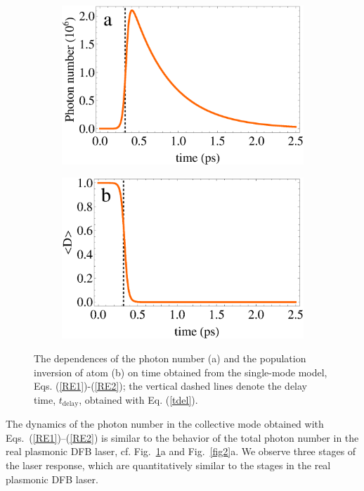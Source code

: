 \documentclass[aps,prapplied,amsmath,amssymb,onecolumn,superscriptaddress,showpacs,floatfix,longbibliography]{revtex4-1}
\begin{document}
\begin{figure}[h]
	\centering
	\begin{subfigure}[h]{0.45\linewidth}
		\includegraphics[width=\linewidth]{Fig4a.eps}
	\end{subfigure}
	\begin{subfigure}[h!]{0.45\linewidth}
		\includegraphics[width=\linewidth]{Fig4b.eps}
	\end{subfigure}
	\caption{The dependences of the photon number (a) and the population inversion of atom (b) on time obtained from the single-mode model, Eqs. (\ref{RE1})-(\ref{RE2}); the vertical dashed lines denote the delay time, $t_{\text{delay}}$, obtained with Eq. (\ref{tdel}).
	}
	\label{fig4}
\end{figure}

The dynamics of the photon number in the collective mode obtained with Eqs.~(\ref{RE1})--(\ref{RE2}) is similar to the behavior of the total photon number in the real plasmonic DFB laser, cf.  Fig.~\ref{fig4}a and Fig.~\ref{fig2}a.
We observe three stages of the laser response, which are quantitatively similar to the stages in the real plasmonic DFB laser.
\end{document}
